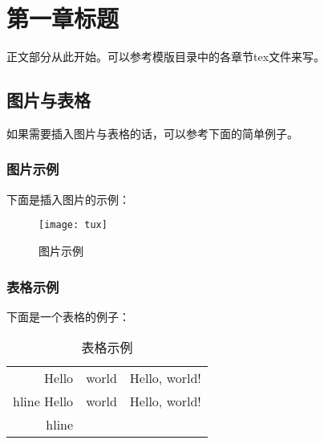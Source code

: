 \documentclass{swfcthesis}
\begin{document}

\makepreliminarypages%
\frontmatter          
\tableofcontents     %
\listoffigures       %
\listoftables        %
\mainmatter

\chapter{第一章标题}


正文部分从此开始。可以参考模版目录中的各章节tex文件来写。

\section{图片与表格}

如果需要插入图片与表格的话，可以参考下面的简单例子。

\subsection{图片示例}

下面是插入图片的示例：

\begin{figure}[!ht]
  \centering
  \texttt{[image: tux]}
  \caption{图片示例}
  \label{fig:hello}
\end{figure}

\subsection{表格示例}

下面是一个表格的例子：

\begin{table}[!ht]
  \centering
  \begin{tabular}{|r|c|l|}
    \hline
    Hello&world&Hello, world!\\hline
    Hello&world&Hello, world!\\hline
  \end{tabular}
  \caption{表格示例}
  \label{tab:hello}
\end{table}
\end{document}
